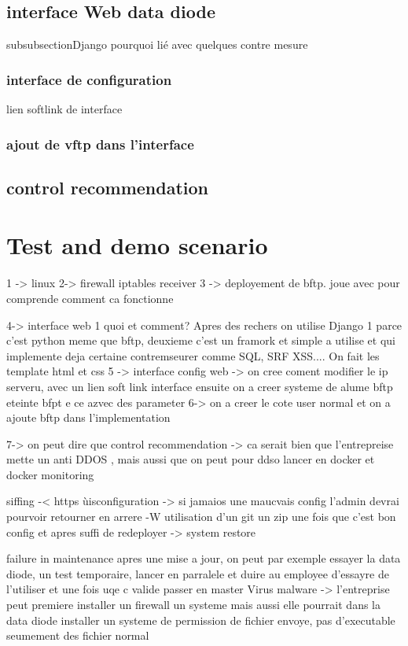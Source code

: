 \documentclass[a4paper,10pt]{article}
\begin{document}
\subsection{interface Web data diode}
subsubsection{Django} pourquoi lié avec quelques contre mesure

\subsubsection{interface de configuration}
lien softlink de interface
\subsubsection{ajout de vftp dans l'interface}
\subsection{control recommendation}
\section{Test and demo scenario}

1 -> linux 
2-> firewall iptables receiver
3 -> deployement de bftp. joue avec pour comprende comment ca fonctionne

4-> interface web 1 quoi et comment? Apres des rechers on utilise Django 1 parce c'est python meme que bftp, deuxieme c'est un framork et simple a utilise et qui implemente deja certaine contremseurer comme SQL, SRF XSS.... On fait les template html et css
5 -> interface config web  -> on cree coment modifier le ip serveru, avec un lien soft link interface ensuite on a creer systeme de alume bftp eteinte bfpt e ce azvec des parameter
6-> on a creer le cote user normal et  on a ajoute bftp dans l'implementation

7-> on peut dire que control recommendation -> ca serait bien que l'entrepreise mette un anti DDOS , mais aussi que on peut pour ddso lancer en docker et docker monitoring

siffing -< https 
ùisconfiguration -> si jamaios une maucvais config l'admin devrai pourvoir retourner en arrere -W utilisation d'un git un zip une fois que c'est bon config et apres suffi de redeployer -> system restore

failure in maintenance apres une mise a jour, on peut par exemple essayer la data diode, un test temporaire, lancer en parralele et duire au employee d'essayre de l'utiliser et une fois uqe c valide passer en master
 Virus malware -> l'entreprise peut premiere installer un firewall un systeme mais aussi elle pourrait dans la data diode installer un systeme de permission de fichier envoye, pas d'executable seumement des fichier normal
 
\end{document}
